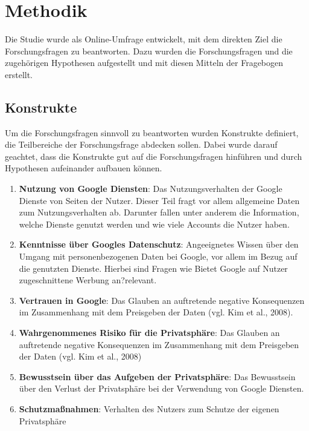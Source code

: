 %
% 

\chapter{Methodik}

Die Studie wurde als Online-Umfrage entwickelt, mit dem direkten Ziel die Forschungsfragen zu beantworten. Dazu wurden die Forschungsfragen und die zugehörigen Hypothesen aufgestellt und mit diesen Mitteln der Fragebogen erstellt.


\section{Konstrukte}
\label{sec:categories}
Um die Forschungsfragen sinnvoll zu beantworten wurden Konstrukte definiert, die Teilbereiche der Forschungsfrage abdecken sollen. Dabei wurde darauf geachtet, dass die Konstrukte gut auf die Forschungsfragen hinführen und durch Hypothesen aufeinander aufbauen können.
\begin{enumerate}
\item \label{itm:Kat0}\textbf{Nutzung von Google Diensten}: Das Nutzungsverhalten der Google Dienste von Seiten der Nutzer. Dieser Teil fragt vor allem allgemeine Daten zum Nutzungsverhalten ab. Darunter fallen unter anderem die Information, welche Dienste genutzt werden und wie viele Accounts die Nutzer haben.
\item \label{itm:Kat1}\textbf{Kenntnisse über Googles Datenschutz}: Angeeignetes Wissen über den Umgang mit personenbezogenen Daten bei Google, vor allem im Bezug auf die genutzten Dienste. Hierbei sind Fragen wie \glqq Bietet Google auf Nutzer zugeschnittene Werbung an?\grqq relevant.
\item \label{itm:Kat2}\textbf{Vertrauen in Google}: Das Glauben an auftretende negative Konsequenzen im Zusammenhang mit dem Preisgeben der Daten (vgl. Kim et al., 2008).
\item \label{itm:Kat3}\textbf{Wahrgenommenes Risiko für die Privatsphäre}: Das Glauben an auftretende negative Konsequenzen im Zusammenhang mit dem Preisgeben der Daten (vgl. Kim et al., 2008)
\item \label{itm:Kat4}\textbf{Bewusstsein über das Aufgeben der Privatsphäre}: Das Bewusstsein über den Verlust der Privatsphäre bei der Verwendung von Google Diensten.
\item \label{itm:Kat5}\textbf{Schutzmaßnahmen}: Verhalten des Nutzers zum Schutze der eigenen Privatsphäre
\end{enumerate}

